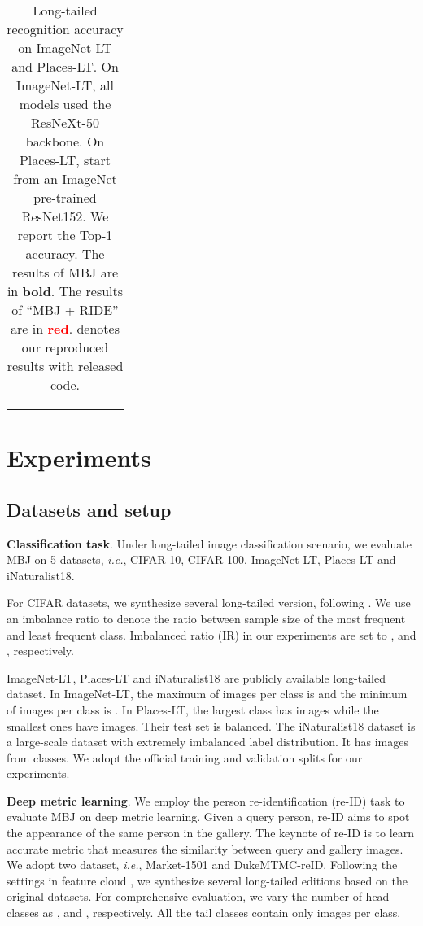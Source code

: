 \documentclass[final]{cvpr}
\def\ie{\textit{i.e.}}
\begin{document}
\begin{table*}[ht]
\begin{tabular}{lcccccccc}
		& \multicolumn{1}{l}{} & \multicolumn{1}{l}{} & \multicolumn{1}{l}{} & \multicolumn{1}{l}{}               & \multicolumn{1}{l}{} & \multicolumn{1}{l}{} & \multicolumn{1}{l}{} & \multicolumn{1}{l}{}
	\end{tabular}
	\vspace{-11mm}
	\caption{Long-tailed recognition accuracy on ImageNet-LT and Places-LT. On ImageNet-LT, all models used the ResNeXt-50 backbone. On Places-LT, start from an ImageNet pre-trained ResNet152. We report the Top-1 accuracy. The results of MBJ are in \textbf{bold}. The results of ``MBJ + RIDE'' are in \textbf{\textcolor{red}{red}}.  denotes our reproduced results with released code.}
	\label{tab:IP}
	\vspace{-0.5cm}
\end{table*}
\section{Experiments}\label{sec:exp}
\subsection{Datasets and setup} \label{sec:setting}
\noindent \textbf{Classification task}. 
Under long-tailed image classification scenario, we evaluate MBJ on 5 datasets, \ie, CIFAR-10, CIFAR-100, ImageNet-LT, Places-LT and iNaturalist18. 

For CIFAR datasets, we synthesize several long-tailed version, following \cite{LDAM}. We use an imbalance ratio to denote the ratio between sample size of the most frequent and least frequent class. Imbalanced ratio (IR) in our experiments are set to ,  and , respectively.

ImageNet-LT, Places-LT and iNaturalist18 are publicly available long-tailed dataset. In ImageNet-LT, the maximum of images per class is  and the minimum of images per class is . In Places-LT, the largest class has  images while the smallest ones have  images. Their test set is balanced. The iNaturalist18 dataset is a large-scale dataset with extremely imbalanced label distribution. It has  images from  classes. We adopt the official training and validation splits for our experiments. 

\noindent \textbf{Deep metric learning}. 
We employ the person re-identification (re-ID) \cite{zhong2018camstyle,sun2018beyond,zheng2019joint} task to evaluate MBJ on deep metric learning. Given a query person, re-ID aims to spot the appearance of the same person in the gallery. The keynote of re-ID is to learn accurate metric that measures the similarity between query and gallery images. We adopt two dataset, \ie, Market-1501\cite{market} and DukeMTMC-reID\cite{dukereid1,dukereid2}. Following the settings in feature cloud \cite{featurecloud}, we synthesize several long-tailed editions based on the original datasets. For comprehensive evaluation, we vary the number of head classes as ,  and , respectively. All the tail classes contain only  images per class. 
\end{document}
